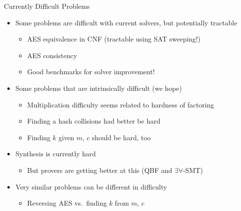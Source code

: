 \documentclass[ignorenonframetext,]{beamer}
\providecommand{\tightlist}{%
  \setlength{\itemsep}{0pt}\setlength{\parskip}{0pt}}
\begin{document}
\begin{frame}{Currently Difficult Problems}

\begin{itemize}
\tightlist
\item
  Some problems are difficult with current solvers, but potentially
  tractable

  \begin{itemize}
  \tightlist
  \item
    AES equivalence in CNF (tractable using SAT sweeping!)
  \item
    AES consistency
  \item
    Good benchmarks for solver improvement!
  \end{itemize}
\item
  Some problems that are intrinsically difficult (we hope)

  \begin{itemize}
  \tightlist
  \item
    Multiplication difficulty seems related to hardness of factoring
  \item
    Finding a hash collisions had better be hard
  \item
    Finding \(k\) given \(m\), \(c\) should be hard, too
  \end{itemize}
\item
  Synthesis is currently hard

  \begin{itemize}
  \tightlist
  \item
    But provers are getting better at this (QBF and
    \(\exists\forall\)-SMT)
  \end{itemize}
\item
  Very similar problems can be different in difficulty

  \begin{itemize}
  \tightlist
  \item
    Reversing AES vs.~finding \(k\) from \(m\), \(c\)
  \end{itemize}
\end{itemize}

\end{frame}
\end{document}
